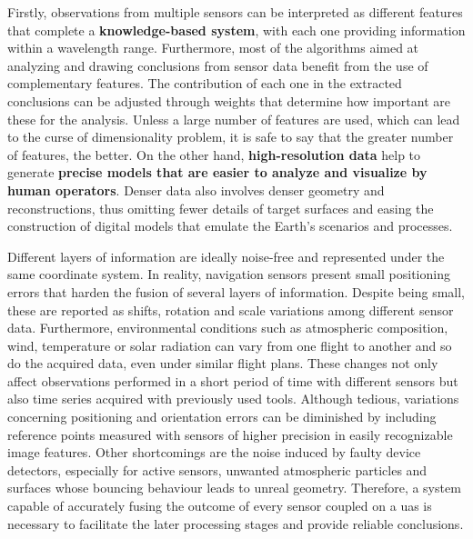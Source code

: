 Firstly, observations from multiple sensors can be interpreted as different features that complete a \textbf{knowledge-based system}, with each one providing information within a wavelength range. Furthermore, most of the algorithms aimed at analyzing and drawing conclusions from sensor data benefit from the use of complementary features. The contribution of each one in the extracted conclusions can be adjusted through weights that determine how important are these for the analysis. Unless a large number of features are used, which can lead to the curse of dimensionality problem, it is safe to say that the greater number of features, the better. On the other hand, \textbf{high-resolution data} help to generate \textbf{precise models that are easier to analyze and visualize by human operators}. Denser data also involves denser geometry and reconstructions, thus omitting fewer details of target surfaces and easing the construction of digital models that emulate the Earth's scenarios and processes. 

Different layers of information are ideally noise-free and represented under the same coordinate system. In reality, navigation sensors present small positioning errors that harden the fusion of several layers of information. Despite being small, these are reported as shifts, rotation and scale variations among different sensor data. Furthermore, environmental conditions such as atmospheric composition, wind, temperature or solar radiation can vary from one flight to another and so do the acquired data, even under similar flight plans. These changes not only affect observations performed in a short period of time with different sensors but also time series acquired with previously used tools. Although tedious, variations concerning positioning and orientation errors can be diminished by including reference points measured with sensors of higher precision in easily recognizable image features. Other shortcomings are the noise induced by faulty device detectors, especially for active sensors, unwanted atmospheric particles and surfaces whose bouncing behaviour leads to unreal geometry. Therefore, a system capable of accurately fusing the outcome of every sensor coupled on a \acrshort{uas} is necessary to facilitate the later processing stages and provide reliable conclusions.

